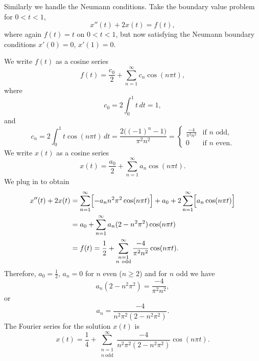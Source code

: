 \documentclass{ximera}
\begin{document}
\begin{example}
    Similarly we handle the Neumann conditions. Take the boundary value problem for $0 < t < 1$,
    \begin{equation*}
        x''(t) + 2 x(t) = f(t) ,
    \end{equation*}
    where again $f(t) = t$ on $0 < t < 1$, but now satisfying the Neumann boundary conditions $x'(0) = 0$, $x'(1)=0$.
\end{example}

\begin{exampleSol}
    We write $f(t)$ as a cosine series
    \begin{equation*}
        f(t) = \frac{c_0}{2} + \sum_{n=1}^\infty c_n \cos (n \pi t) ,
    \end{equation*}
    where
    \begin{equation*}
        c_0 = 2 \int_0^1 t \,dt = 1 ,
    \end{equation*}
    and
    \begin{equation*}
        c_n = 2 \int_0^1 t \cos (n \pi t) \,dt = \frac{2\bigl({(-1)}^n-1\bigr)}{\pi^2 n^2} = 
        \begin{cases}
            \frac{-4}{\pi^2 n^2} & \text{if } n \text{ odd} , \\
            0 & \text{if } n \text{ even}.
        \end{cases}
    \end{equation*}
    We write $x(t)$ as a cosine series
    \begin{equation*}
        x(t) = \frac{a_0}{2} + \sum_{n=1}^\infty a_n \cos (n \pi t) .
    \end{equation*}
    We plug in to obtain 
    \begin{equation*}
        \begin{split}
            x''(t) + 2 x(t) 
            & = \sum_{n=1}^\infty \Bigl[ - a_n n^2 \pi^2 \cos (n \pi t) \Bigr] + a_0 + 2 \sum_{n=1}^\infty \Bigl[ a_n \cos (n \pi t) \Bigr] \\
            & = a_0 + \sum_{n=1}^\infty a_n (2 - n^2 \pi^2 ) \cos (n \pi t) \\
            & = f(t) = \frac{1}{2} + \sum_{\substack{n=1\\n~\text{odd}}}^\infty \frac{-4}{\pi^2 n^2} \cos (n \pi t) .
        \end{split}
    \end{equation*}
    Therefore, $a_0 = \frac{1}{2}$, $a_n = 0$ for $n$ even ($n \geq 2$) and for $n$ odd we have
    \begin{equation*}
        a_n (2 - n^2 \pi^2) = \frac{-4}{\pi^2 n^2} ,
    \end{equation*}
    or
    \begin{equation*}
        a_n = \frac{-4}{n^2 \pi^2 (2 - n^2 \pi^2)} .
    \end{equation*}
    The Fourier series for the solution $x(t)$ is
    \begin{equation*}
        x(t) = \frac{1}{4} + \sum_{\substack{n=1\\n~\text{odd}}}^\infty \frac{-4}{n^2 \pi^2 (2 - n^2 \pi^2)} \cos (n \pi t) .
    \end{equation*}
\end{exampleSol}
\end{document}
